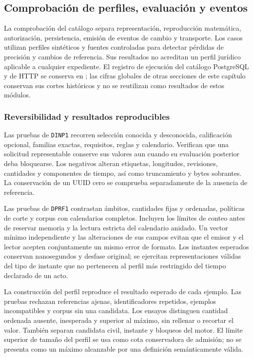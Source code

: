 \subsection{Comprobación de perfiles, evaluación y eventos}\label{sec:pruebas-perfiles-plazos}

La comprobación del catálogo separa representación, reproducción matemática, autorización, persistencia, emisión de eventos de cambio y transporte. Los casos utilizan perfiles sintéticos y fuentes controladas para detectar pérdidas de precisión y cambios de referencia. Sus resultados no acreditan un perfil jurídico aplicable a cualquier expediente. El registro de ejecución del catálogo PostgreSQL y de HTTP se conserva en ; las cifras globales de otras secciones de este capítulo conservan sus cortes históricos y no se reutilizan como resultados de estos módulos.

\subsubsection{Reversibilidad y resultados reproducibles}

Las pruebas de \texttt{DINP1} recorren selección conocida y desconocida, calificación opcional, familias exactas, requisitos, reglas y calendario. Verifican que una solicitud representable conserve sus valores aun cuando su evaluación posterior deba bloquearse. Los negativos alteran etiquetas, longitudes, revisiones, cantidades y componentes de tiempo, así como truncamiento y bytes sobrantes. La conservación de un UUID cero se comprueba separadamente de la ausencia de referencia.

Las pruebas de \texttt{DPRF1} contrastan ámbitos, cantidades fijas y ordenadas, políticas de corte y corpus con calendarios completos. Incluyen los límites de conteo antes de reservar memoria y la lectura estricta del calendario anidado. Un vector mínimo independiente y las alteraciones de sus campos evitan que el emisor y el lector acepten conjuntamente un mismo error de formato. Los instantes esperados conservan nanosegundos y desfase original; se ejercitan representaciones válidas del tipo de instante que no pertenecen al perfil más restringido del tiempo declarado de un acto.

La construcción del perfil reproduce el resultado esperado de cada ejemplo. Las pruebas rechazan referencias ajenas, identificadores repetidos, ejemplos incompatibles y corpus sin una candidata. Los ensayos distinguen cantidad ordenada ausente, inesperada y superior al máximo, sin rellenar o recortar el valor. También separan candidata civil, instante y bloqueos del motor. El límite superior de tamaño del perfil se usa como cota conservadora de admisión; no se presenta como un máximo alcanzable por una definición semánticamente válida.

